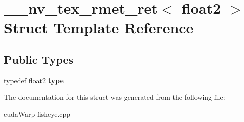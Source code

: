 \hypertarget{struct____nv__tex__rmet__ret_3_01float2_01_4}{}\section{\+\_\+\+\_\+nv\+\_\+tex\+\_\+rmet\+\_\+ret$<$ float2 $>$ Struct Template Reference}
\label{struct____nv__tex__rmet__ret_3_01float2_01_4}
\subsection*{Public Types}
\begin{DoxyCompactItemize}
\item 
typedef float2 {\bfseries type}\hypertarget{struct____nv__tex__rmet__ret_3_01float2_01_4_a0f78aab5fc257c8001bc2f9aaf7beca3}{}\label{struct____nv__tex__rmet__ret_3_01float2_01_4_a0f78aab5fc257c8001bc2f9aaf7beca3}

\end{DoxyCompactItemize}


The documentation for this struct was generated from the following file\+:\begin{DoxyCompactItemize}
\item 
cuda\+Warp-\/fisheye.\+cpp\end{DoxyCompactItemize}
